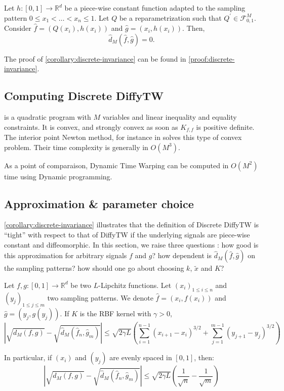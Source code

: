 \begin{corollary}\label{corollary:discrete-invariance}
Let $h: [0, 1] \to \mathbb R^d$ be a piece-wise constant function adapted to the sampling pattern $0 \leq x_1 < \ldots < x_n \leq 1$. Let $Q$ be a reparametrization such that $Q^\prime \in \mathcal F_{0,1}^M$. Consider $\hat f = (Q(x_i), h(x_i))$ and $\hat g = (x_i, h(x_i))$. Then,
\begin{equation}
    \hat d_M(\hat f, \hat g) = 0.
\end{equation}
\end{corollary}
The proof of \cref{corollary:discrete-invariance} can be found in \cref{proof:discrete-invariance}.

\subsection{Computing Discrete DiffyTW}\label{sec:solving-qp}

 is a quadratic program with $M$ variables and linear inequality and equality constraints. It is convex, and strongly convex as soon as $K_{f,f}$ is positive definite. The interior point Newton method, for instance in \cite{fabian} solves this type of convex problem. Their time complexity is generally in $O(M^3)$.

As a point of comparaison, Dynamic Time Warping can be computed in $O(M^2)$ time using Dynamic programming.

\subsection{Approximation \& parameter choice}
\cref{corollary:discrete-invariance} illustrates that the definition of Discrete DiffyTW is ``tight'' with respect to that of DiffyTW if the underlying signals are piece-wise constant and diffeomorphic. In this section, we raise three questions : how good is this approximation for arbitrary signals $f$ and $g$? how dependent is $\hat d_M(\hat f, \hat g)$ on the sampling patterns? how should one go about choosing $k$, $\tilde x$ and $K$?

\begin{theorem}\label{thm:rectangle-approx}
Let $f,g:[0,1] \to \mathbb R^d$ be two $L$-Lipchitz functions. Let $(x_i)_{1\leq i \leq n}$ and $(y_j)_{1\leq j\leq m}$ two sampling patterns. We denote $\hat f = (x_i, f(x_i))$ and $\hat g = (y_j, g(y_j))$.
If $K$ is the RBF kernel with $\gamma > 0$,
\begin{equation}
    \left\vert \sqrt{d_M(f, g)} - \sqrt{\hat d_M(\hat f_n, \hat g_m)}\right\vert \leq \sqrt{2\gamma L}\left(\sum_{i=1}^{n-1} (x_{i+1} - x_i)^{3/2} + \sum_{j=1}^{m-1} (y_{j+1} - y_j)^{3/2}\right)
\end{equation}

In particular, if $(x_i)$ and $(y_j)$ are evenly spaced in $[0,1]$, then:
\begin{equation}
    \left\vert \sqrt{d_M(f, g)} - \sqrt{\hat d_M(\hat f_n, \hat g_m)}\right\vert \leq \sqrt{2\gamma L}\left(\frac{1}{\sqrt{n}} - \frac{1}{\sqrt{m}}\right)
\end{equation}
\end{theorem}

